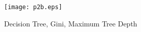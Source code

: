 





\begin{figure}[h]
  \centering
  \texttt{[image: p2b.eps]}
  \label{p2b}
  \caption{Decision Tree, Gini, Maximum Tree Depth}
\end{figure}
